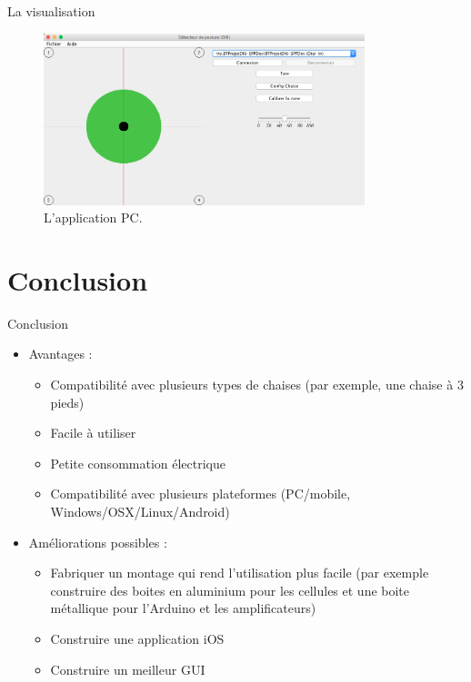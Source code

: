 \documentclass{beamer}
\begin{document}
\begin{frame}
\begin{block}{La visualisation}
\begin{figure}[htbp]
\begin{center}
\includegraphics[height=5cm]{images/screenshot_pc1}
\end{center}
\caption{L'application PC.}
\label{fig:screenshot_pc}
\end{figure}
\end{block}
\end{frame}

\section{Conclusion}
\begin{frame}
\begin{block}{Conclusion}
\pause
\begin{itemize}
\item Avantages :
\pause
\begin{itemize}
\item Compatibilité avec plusieurs types de chaises (par exemple, une chaise à 3 pieds)
\pause
\item Facile à utiliser
\pause
\item Petite consommation électrique 
\pause
\item Compatibilité avec plusieurs plateformes (PC/mobile, Windows/OSX/Linux/Android)
\pause
\end{itemize}
\item Améliorations possibles :
\pause
\begin{itemize}
\item Fabriquer un montage qui rend l'utilisation plus facile (par exemple construire des boites en aluminium pour les cellules et une boite métallique pour l'Arduino et les amplificateurs)
\pause
\item Construire une application iOS
\pause
\item Construire un meilleur GUI
\end{itemize}
\end{itemize}
\end{block}
\end{frame}
\end{document}
